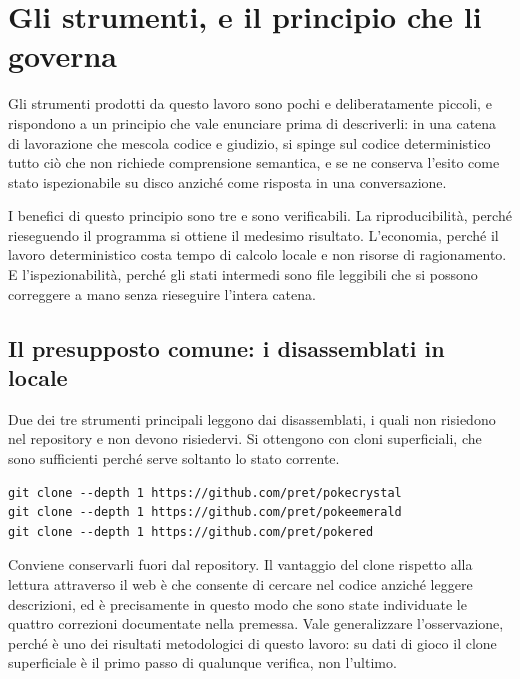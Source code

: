 
\chapter{Gli strumenti, e il principio che li governa}
\label{cap:strumenti}

Gli strumenti prodotti da questo lavoro sono pochi e deliberatamente piccoli, e rispondono a un principio che vale enunciare prima di descriverli: in una catena di lavorazione che mescola codice e giudizio, si spinge sul codice deterministico tutto ciò che non richiede comprensione semantica, e se ne conserva l'esito come stato ispezionabile su disco anziché come risposta in una conversazione.

I benefici di questo principio sono tre e sono verificabili. La riproducibilità, perché rieseguendo il programma si ottiene il medesimo risultato. L'economia, perché il lavoro deterministico costa tempo di calcolo locale e non risorse di ragionamento. E l'ispezionabilità, perché gli stati intermedi sono file leggibili che si possono correggere a mano senza rieseguire l'intera catena.

\section{Il presupposto comune: i disassemblati in locale}

Due dei tre strumenti principali leggono dai disassemblati, i quali non risiedono nel repository e non devono risiedervi. Si ottengono con cloni superficiali, che sono sufficienti perché serve soltanto lo stato corrente.

\begin{verbatim}
git clone --depth 1 https://github.com/pret/pokecrystal
git clone --depth 1 https://github.com/pret/pokeemerald
git clone --depth 1 https://github.com/pret/pokered
\end{verbatim}

Conviene conservarli fuori dal repository. Il vantaggio del clone rispetto alla lettura attraverso il web è che consente di cercare nel codice anziché leggere descrizioni, ed è precisamente in questo modo che sono state individuate le quattro correzioni documentate nella premessa. Vale generalizzare l'osservazione, perché è uno dei risultati metodologici di questo lavoro: su dati di gioco il clone superficiale è il primo passo di qualunque verifica, non l'ultimo.

